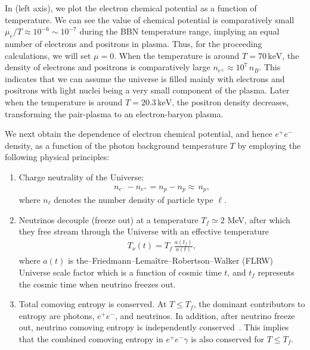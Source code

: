 In  (left axis), we plot the electron chemical potential as a function of temperature. We can see the value of chemical potential is comparatively small $\mu_e/T\approx10^{-6}\sim10^{-7}$ during the BBN temperature range, implying an equal number of electrons and positrons in plasma. Thus, for the proceeding calculations, we will set $\mu =0$. When the temperature is around $T=70\,\mathrm{keV}$, the density of electrons and positrons is comparatively large $n_{e^\pm}\approx10^7\,n_B$. This indicates that we can assume the universe is filled mainly with electrons and positrons with light nuclei being a very small component of the plasma. Later when the temperature is around $T=20.3\,\mathrm{keV}$, the positron density decreases, transforming the pair-plasma to an electron-baryon plasma.


We next obtain the dependence of electron chemical potential, and hence $e^+e^-$ density, as a function of the photon background temperature $T$ by employing the following physical principles:
\begin{enumerate}
\item Charge neutrality of the Universe:
\begin{align}\label{neutrality}
n_{e^-}-n_{{e^+}}=n_p-n_{\overline{p}}\approx\,n_p,
\end{align}
where $n_\ell$ denotes the number density of particle type $\ell$.
\item Neutrinos decouple (freeze out) at a temperature $T_f\simeq 2$ MeV, after which they free stream through the Universe with an effective temperature~\cite{Birrell:2012gg}
\begin{align}
 T_\nu(t)=T_f\,\frac{a(t_f)}{a(t)},
\end{align}
where $a(t)$ is the--Friedmann--Lema\^{i}tre--Robertson--Walker (FLRW) Universe scale factor which is a function of cosmic time $t$, and $t_f$ represents the cosmic time when neutrino freezes out.
\item Total comoving entropy is conserved. At $T\leq T_f$, the dominant contributors to entropy are photons, $e^+e^-$, and neutrinos. In addition, after neutrino freeze out, neutrino comoving entropy is independently conserved~\cite{Birrell:2012gg}. This implies that the combined comoving entropy in $e^+e^-\gamma$ is also conserved for $T\leq T_f$.
\end{enumerate}

